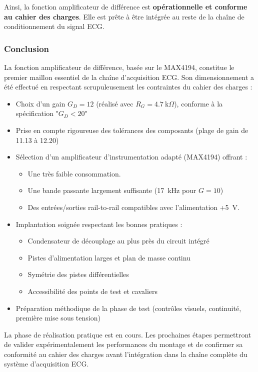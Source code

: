 \documentclass{article}
\begin{document}
Ainsi, la fonction amplificateur de différence est \textbf{opérationnelle et conforme au cahier des charges}. Elle est prête à être intégrée au reste de la chaîne de conditionnement du signal ECG.

\subsubsection{Conclusion}

La fonction amplificateur de différence, basée sur le MAX4194, constitue le premier maillon essentiel de la chaîne d'acquisition ECG. Son dimensionnement a été effectué en respectant scrupuleusement les contraintes du cahier des charges :

\begin{itemize}
    \item Choix d'un gain $G_D = 12$ (réalisé avec $R_G = 4.7~\text{k}\Omega$), conforme à la spécification "$G_D < 20$"
    \item Prise en compte rigoureuse des tolérances des composants (plage de gain de 11.13 à 12.20)
    \item Sélection d'un amplificateur d'instrumentation adapté (MAX4194) offrant :
    \begin{itemize}
        \item Une très faible consommation.
        \item Une bande passante largement suffisante (17~kHz pour $G = 10$)
        \item Des entrées/sorties rail-to-rail compatibles avec l'alimentation +5~V.
    \end{itemize}
    \item Implantation soignée respectant les bonnes pratiques :
    \begin{itemize}
        \item Condensateur de découplage au plus près du circuit intégré
        \item Pistes d'alimentation larges et plan de masse continu
        \item Symétrie des pistes différentielles
        \item Accessibilité des points de test et cavaliers
    \end{itemize}
    \item Préparation méthodique de la phase de test (contrôles visuels, continuité, première mise sous tension)
\end{itemize}

La phase de réalisation pratique est en cours. Les prochaines étapes permettront de valider expérimentalement les performances du montage et de confirmer sa conformité au cahier des charges avant l'intégration dans la chaîne complète du système d'acquisition ECG.
\end{document}
